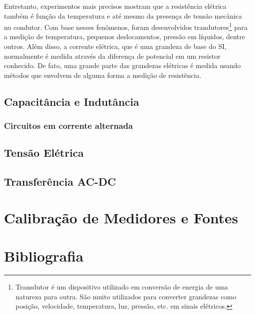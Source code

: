 \documentclass{book}
\begin{document}
Entretanto, experimentos mais precisos mostram que a resistência elétrica também é função da temperatura e até mesmo da presença de tensão mecânica no condutor. Com base nesses fenômenos, foram desenvolvidos trandutores\footnote{Transdutor é um dispositivo utilizado em conversão de energia de uma natureza para outra. São muito utilizados para converter grandezas como posição, velocidade, temperatura, luz, pressão, etc. em sinais elétricos.} para a medição de temperatura, pequenos deslocamentos, pressão em líquidos, dentre outros. Além disso, a corrente elétrica, que é uma grandeza de base do SI, normalmente é medida através da diferença de potencial em um resistor conhecido. De fato, uma grande parte das grandezas elétricas é medida usando métodos que envolvem de alguma forma a medição de resistência.

\section{Capacitância e Indutância}

\subsection{Circuitos em corrente alternada}

\section{Tensão Elétrica}
\section{Transferência AC-DC}
\chapter{Calibração de Medidores e Fontes}



\backmatter
\chapter{Bibliografia}
\end{document}
